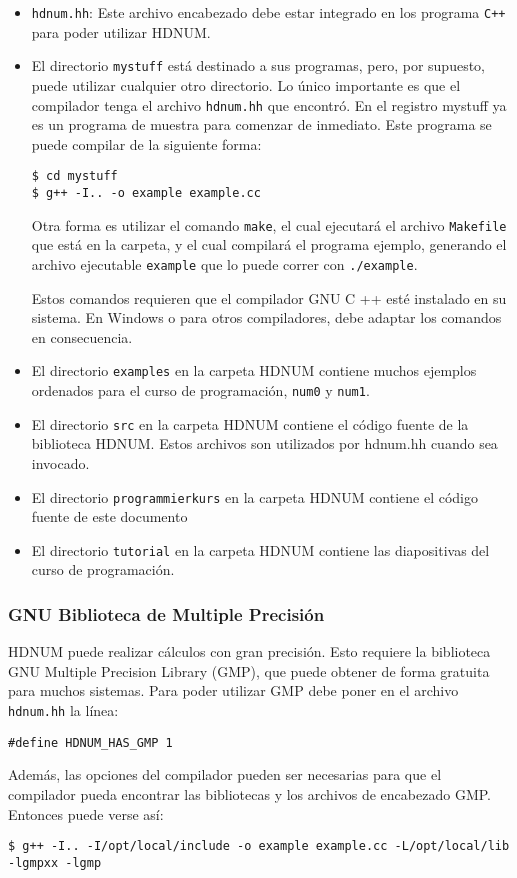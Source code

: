 \documentclass[a4paper,11pt]{article}
\theoremstyle{definition}
\begin{document}
\begin{itemize}
\item \lstinline{hdnum.hh}: Este archivo encabezado debe estar integrado en los programa \lstinline{C++} para poder utilizar HDNUM.
\item 
El directorio \lstinline{mystuff} está destinado a sus programas, pero, por supuesto, puede utilizar cualquier otro directorio. Lo único importante es que el compilador tenga el archivo \lstinline{hdnum.hh} que encontró. En el registro mystuff ya es un programa de muestra para comenzar de inmediato. Este programa se puede compilar de la siguiente forma:

\begin{lstlisting}[basicstyle=\ttfamily\small,frame=single]
$ cd mystuff
$ g++ -I.. -o example example.cc
\end{lstlisting}
Otra forma es utilizar el comando \lstinline{make}, el cual ejecutará el archivo \lstinline{Makefile} que está en la carpeta, y el cual compilará el programa ejemplo, generando el archivo ejecutable \lstinline{example} que lo puede correr con \lstinline{./example}.

Estos comandos requieren que el compilador GNU C ++ esté instalado en su sistema. En Windows o para otros compiladores, debe adaptar los comandos en consecuencia.

\item El directorio \lstinline{examples} en la carpeta HDNUM contiene muchos ejemplos ordenados para el curso de programación, \lstinline{num0} y \lstinline{num1}.
\item El directorio \lstinline{src} en la carpeta HDNUM contiene el código fuente de la biblioteca HDNUM. Estos archivos son utilizados por hdnum.hh cuando sea invocado.
\item El directorio \lstinline{programmierkurs} en la carpeta HDNUM contiene el código fuente de este documento
\item El directorio \lstinline{tutorial}  en la carpeta HDNUM contiene las diapositivas del curso de programación.
\end{itemize}

\subsubsection*{GNU Biblioteca de Multiple Precisión}

HDNUM puede realizar cálculos con gran precisión. Esto requiere la biblioteca GNU Multiple Precision Library (GMP), que puede obtener de forma gratuita para muchos sistemas. Para poder utilizar GMP debe poner en el archivo \lstinline{hdnum.hh} la línea:
\begin{lstlisting}[basicstyle=\ttfamily\small,frame=single]
#define HDNUM_HAS_GMP 1
\end{lstlisting}
Además, las opciones del compilador pueden ser necesarias para que el compilador pueda encontrar las bibliotecas y los archivos de encabezado GMP. Entonces puede verse así:
\begin{lstlisting}[basicstyle=\ttfamily\footnotesize,frame=single]
$ g++ -I.. -I/opt/local/include -o example example.cc -L/opt/local/lib -lgmpxx -lgmp
\end{lstlisting}
\end{document}
